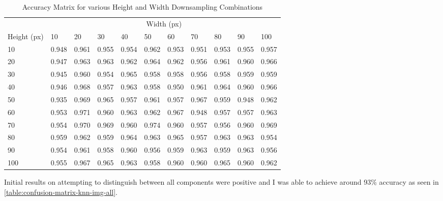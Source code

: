 \begin{table}[H]

    \begin{tabularx}{\textwidth}{ lXXXXXXXXXX }
    \toprule
    & \multicolumn{10}{c}{Width (px)} \\
    \cmidrule{2-11}
    Height (px) & 10   & 20   & 30   & 40   & 50   & 60   & 70   & 80   & 90   & 100  \\
    \midrule
    10          & 0.948 & 0.961 & 0.955 & 0.954 & 0.962 & 0.953 & 0.951 & 0.953 & 0.955 & 0.957 \\
    20          & 0.947 & 0.963 & 0.963 & 0.962 & 0.964 & 0.962 & 0.956 & 0.961 & 0.960 & 0.966 \\
    30          & 0.945 & 0.960 & 0.954 & 0.965 & 0.958 & 0.958 & 0.956 & 0.958 & 0.959 & 0.959 \\
    40          & 0.946 & 0.968 & 0.957 & 0.963 & 0.958 & 0.950 & 0.961 & 0.964 & 0.960 & 0.966 \\
    50          & 0.935 & 0.969 & 0.965 & 0.957 & 0.961 & 0.957 & 0.967 & 0.959 & 0.948 & 0.962 \\
    60          & 0.953 & 0.971 & 0.960 & 0.963 & 0.962 & 0.967 & 0.948 & 0.957 & 0.957 & 0.963 \\
    70          & 0.954 & 0.970 & 0.969 & 0.960 & 0.974 & 0.960 & 0.957 & 0.956 & 0.960 & 0.969 \\
    80          & 0.959 & 0.962 & 0.959 & 0.964 & 0.963 & 0.965 & 0.957 & 0.963 & 0.963 & 0.954 \\
    90          & 0.954 & 0.961 & 0.958 & 0.960 & 0.956 & 0.959 & 0.963 & 0.959 & 0.963 & 0.956 \\
    100         & 0.955 & 0.967 & 0.965 & 0.963 & 0.958 & 0.960 & 0.960 & 0.965 & 0.960 & 0.962 \\
    \bottomrule
    \end{tabularx}

    \caption{Accuracy Matrix for various Height and Width Downsampling Combinations}
    \label{table:height-width-matrix}
\end{table}

Initial results on attempting to distinguish between all components were positive and I was able to achieve around 93\% accuracy as seen in \cref{table:confusion-matrix-knn-img-all}.

